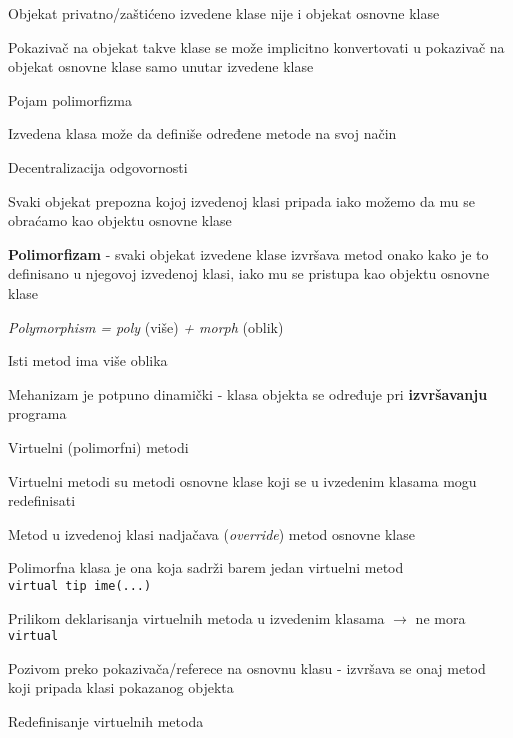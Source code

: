 \documentclass{article}
\newenvironment{xitemize}{%
    
    \itemize
    \larger
}{%
    \enditemize
}
\let\olditemize\itemize
\let\endolditemize\enditemize
\renewenvironment{itemize}{%
    \smaller
    \olditemize
}{%
    \endolditemize
}
\providecommand{\inlinecode}[1]{\texttt{#1}}
\begin{document}
\begin{xitemize}
\begin{itemize}
    \item Objekat privatno/zaštićeno izvedene klase nije i objekat osnovne klase
    \item Pokazivač na objekat takve klase se može implicitno konvertovati u pokazivač na objekat osnovne klase samo unutar izvedene klase
\end{itemize}
\item Pojam polimorfizma
\begin{itemize}
    \item Izvedena klasa može da definiše određene metode na svoj način
\end{itemize}
\item Decentralizacija odgovornosti
\begin{itemize}
    \item Svaki objekat prepozna kojoj izvedenoj klasi pripada iako možemo da mu se obraćamo kao objektu osnovne klase
    \item \textbf{Polimorfizam} - svaki objekat izvedene klase izvršava metod onako kako je to definisano u njegovoj izvedenoj klasi, iako mu se pristupa kao objektu osnovne klase
    \item \textit{Polymorphism = poly} (više) \textit{ + morph} (oblik)
    \item Isti metod ima više oblika
    \item Mehanizam je potpuno dinamički - klasa objekta se određuje pri \textbf{izvršavanju} programa
\end{itemize}
\item Virtuelni (polimorfni) metodi
\begin{itemize}
    \item Virtuelni metodi su metodi osnovne klase koji se u ivzedenim klasama mogu redefinisati
    \item Metod u izvedenoj klasi nadjačava (\textit{override}) metod osnovne klase
    \item Polimorfna klasa je ona koja sadrži barem jedan virtuelni metod\\
    \inlinecode{virtual tip ime(...)}
    \item Prilikom deklarisanja virtuelnih metoda u izvedenim klasama $\rightarrow$ ne mora \inlinecode{virtual}
    \item Pozivom preko pokazivača/referece na osnovnu klasu - izvršava se onaj metod koji pripada klasi pokazanog objekta
\end{itemize}
\item Redefinisanje virtuelnih metoda

\end{xitemize}
\end{document}

